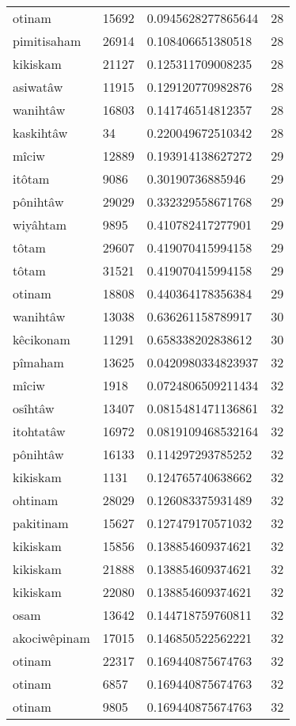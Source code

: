 \begin{longtable}{llll}
otinam & 15692 & 0.0945628277865644 & 28 \\
pimitisaham & 26914 & 0.108406651380518 & 28 \\
kikiskam & 21127 & 0.125311709008235 & 28 \\
asiwatâw & 11915 & 0.129120770982876 & 28 \\
wanihtâw & 16803 & 0.141746514812357 & 28 \\
kaskihtâw & 34 & 0.220049672510342 & 28 \\
mîciw & 12889 & 0.193914138627272 & 29 \\
itôtam & 9086 & 0.30190736885946 & 29 \\
pônihtâw & 29029 & 0.332329558671768 & 29 \\
wiyâhtam & 9895 & 0.410782417277901 & 29 \\
tôtam & 29607 & 0.419070415994158 & 29 \\
tôtam & 31521 & 0.419070415994158 & 29 \\
otinam & 18808 & 0.440364178356384 & 29 \\
wanihtâw & 13038 & 0.636261158789917 & 30 \\
kêcikonam & 11291 & 0.658338202838612 & 30 \\
pîmaham & 13625 & 0.0420980334823937 & 32 \\
mîciw & 1918 & 0.0724806509211434 & 32 \\
osîhtâw & 13407 & 0.0815481471136861 & 32 \\
itohtatâw & 16972 & 0.0819109468532164 & 32 \\
pônihtâw & 16133 & 0.114297293785252 & 32 \\
kikiskam & 1131 & 0.124765740638662 & 32 \\
ohtinam & 28029 & 0.126083375931489 & 32 \\
pakitinam & 15627 & 0.127479170571032 & 32 \\
kikiskam & 15856 & 0.138854609374621 & 32 \\
kikiskam & 21888 & 0.138854609374621 & 32 \\
kikiskam & 22080 & 0.138854609374621 & 32 \\
osam & 13642 & 0.144718759760811 & 32 \\
akociwêpinam & 17015 & 0.146850522562221 & 32 \\
otinam & 22317 & 0.169440875674763 & 32 \\
otinam & 6857 & 0.169440875674763 & 32 \\
otinam & 9805 & 0.169440875674763 & 32 \\

\end{longtable}
